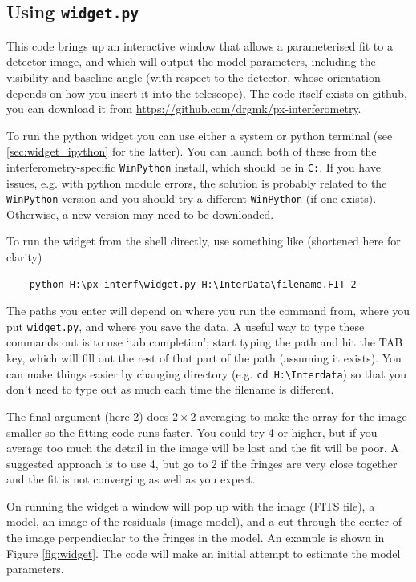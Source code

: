 \documentclass[11pt]{article}
\begin{document}
\subsection{Using \texttt{widget.py}}\label{sec:widget}

This code brings up an interactive window that allows a parameterised fit to a detector image, and which will output the model parameters, including the visibility and baseline angle (with respect to the detector, whose orientation depends on how you insert it into the telescope). The code itself exists on github, you can download it from
\href{https://github.com/drgmk/px-interferometry}{https://github.com/drgmk/px-interferometry}.

To run the python widget you can use either a system or python terminal (see \ref{sec:widget_ipython} for the latter). You can launch both of these from the interferometry-specific \texttt{WinPython} install, which should be in \texttt{C:}. If you have issues, e.g. with python module errors, the solution is probably related to the \texttt{WinPython} version and you should try a different \texttt{WinPython} (if one exists). Otherwise, a new version may need to be downloaded.

To run the widget from the shell directly, use something like (shortened here for clarity)
\begin{verbatim}
    python H:\px-interf\widget.py H:\InterData\filename.FIT 2
\end{verbatim}
The paths you enter will depend on where you run the command from, where you put \texttt{widget.py}, and where you save the data. A useful way to type these commands out is to use `tab completion'; start typing the path and hit the TAB key, which will fill out the rest of that part of the path (assuming it exists). You can make things easier by changing directory (e.g. \texttt{cd H:\textbackslash Interdata}) so that you don't need to type out as much each time the filename is different.

The final argument (here 2) does $2 \times 2$ averaging to make the array for the image smaller so the fitting code runs faster. You could try 4 or higher, but if you average too much the detail in the image will be lost and the fit will be poor. A suggested approach is to use 4, but go to 2 if the fringes are very close together and the fit is not converging as well as you expect.

On running the widget a window will pop up with the image (FITS file), a model, an image of the residuals (image-model), and a cut through the center of the image perpendicular to the fringes in the model. An example is shown in Figure \ref{fig:widget}. The code will make an initial attempt to estimate the model parameters.
\end{document}
